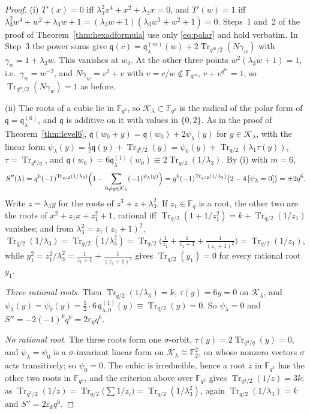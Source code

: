 \documentclass[12pt,a4paper]{amsart}
\theoremstyle{definition}
\newcommand{\F}{\mathbb{F}}
\newcommand{\Tr}{\operatorname{Tr}}
\newcommand{\eps}{\varepsilon}
\newcommand{\Kk}{\mathcal{K}}
\newcommand{\qq}{\mathfrak{q}}
\newcommand{\Spp}{S''}
\begin{document}
\begin{proof}
(i) $T'(x)=0$ iff $\lambda_3^2x^4+x^2+\lambda_3x=0$, and $T'(w)=1$ iff $\lambda_3^2w^4+w^2+\lambda_3w+1=(\lambda_3w+1)(\lambda_3w^3+w^2+1)=0$. Steps~1 and~2 of the proof of Theorem~\ref{thm:hexadformula} use only \eqref{eq:polar} and hold verbatim. In Step~3 the power sums give $\qq(c)=\qq^{(m)}_\lambda(w)+2\Tr_{q^m/2}(N\gamma_w)$ with $\gamma_w=1+\lambda_3w$. This vanishes at $w_0$. At the other three points $w^2(\lambda_3w+1)=1$, i.e.\ $\gamma_w=w^{-2}$, and $N\gamma_w=v^2+v$ with $v=c/w\notin\F_{q^m}$, $v+v^{q^m}=1$, so $\Tr_{q^m/2}(N\gamma_w)=1$ as before.

(ii) The roots of a cubic lie in $\F_{q^6}$, so $\Kk_\lambda\subset\F_{q^6}$ is the radical of the polar form of $\qq=\qq^{(6)}_\lambda$, and $\qq$ is additive on it with values in $\{0,2\}$. As in the proof of Theorem~\ref{thm:level6}, $\qq(w_0+y)=\qq(w_0)+2\psi_\lambda(y)$ for $y\in\Kk_\lambda$, with the linear form $\psi_\lambda(y)=\frac12\qq(y)+\Tr_{q^6/2}(y)=\psi_0(y)+\Tr_{q/2}(\lambda_1\tau(y))$, $\tau=\Tr_{q^6/q}$, and $\qq(w_0)=6\qq^{(1)}_\lambda(w_0)\equiv2\Tr_{q/2}(1/\lambda_3)$. By (i) with $m=6$,
\[
\Spp(\lambda)=q^6(-1)^{\Tr_{q/2}(1/\lambda_3)}\Bigl(1-\sum_{0\ne y\in\Kk_\lambda}(-1)^{\psi_\lambda(y)}\Bigr)=q^6(-1)^{\Tr_{q/2}(1/\lambda_3)}\bigl(2-4\,[\psi_\lambda=0]\bigr)=\pm2q^6 .
\]
Write $z=\lambda_3y$ for the roots of $z^3+z+\lambda_3^2$. If $z_1\in\F_q$ is a root, the other two are the roots of $x^2+z_1x+z_1^2+1$, rational iff $\Tr_{q/2}(1+1/z_1^2)=k+\Tr_{q/2}(1/z_1)$ vanishes; and from $\lambda_3^2=z_1(z_1+1)^2$, $\Tr_{q/2}(1/\lambda_3)=\Tr_{q/2}(1/\lambda_3^2)=\Tr_{q/2}\bigl(\tfrac1{z_1}+\tfrac1{z_1+1}+\tfrac1{(z_1+1)^2}\bigr)=\Tr_{q/2}(1/z_1)$, while $y_1^2=z_1^2/\lambda_3^2=\frac1{z_1+1}+\frac1{(z_1+1)^2}$ gives $\Tr_{q/2}(y_1)=0$ for every rational root $y_1$.

\emph{Three rational roots.} Then $\Tr_{q/2}(1/\lambda_3)=k$, $\tau(y)=6y=0$ on $\Kk_\lambda$, and $\psi_\lambda(y)=\psi_0(y)=\frac12\cdot6\,\qq^{(1)}_{\lambda,0}(y)\equiv\Tr_{q/2}(y)=0$. So $\psi_\lambda=0$ and $\Spp=-2(-1)^kq^6=2\eps_kq^6$.

\emph{No rational root.} The three roots form one $\sigma$-orbit, $\tau(y)=2\Tr_{q^3/q}(y)=0$, and $\psi_\lambda=\psi_0$ is a $\sigma$-invariant linear form on $\Kk_\lambda\cong\F_2^2$, on whose nonzero vectors $\sigma$ acts transitively; so $\psi_0=0$. The cubic is irreducible, hence a root $z$ in $\F_{q^3}$ has the other two roots in $\F_{q^3}$, and the criterion above over $\F_{q^3}$ gives $\Tr_{q^3/2}(1/z)=3k$; as $\Tr_{q^3/2}(1/z)=\Tr_{q/2}\bigl(\sum1/z_i\bigr)=\Tr_{q/2}(1/\lambda_3^2)$, again $\Tr_{q/2}(1/\lambda_3)=k$ and $\Spp=2\eps_kq^6$.


\end{proof}
\end{document}
